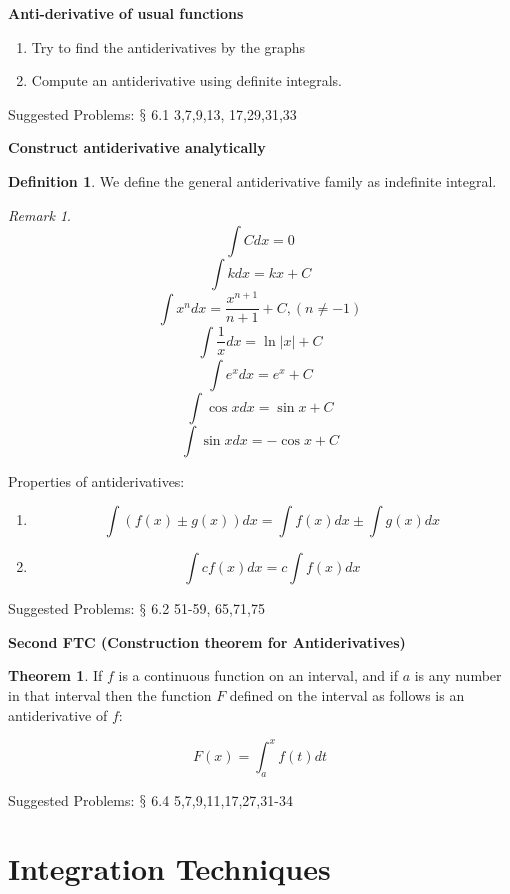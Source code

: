 \documentclass[12pt]{article}
\theoremstyle{definition}
\newtheorem{thm}{Theorem}[section]
\theoremstyle{definition}
\newtheorem{definition}{Definition}[section]
\theoremstyle{remark}
\newtheorem*{remark}{Remark}
\theoremstyle{definition}
\theoremstyle{definition}
\theoremstyle{definition}
\begin{document}
\textbf{Anti-derivative of usual functions}

\begin{enumerate}
	\item Try to find the antiderivatives by the graphs
	\item Compute an antiderivative using definite integrals.
\end{enumerate}

Suggested Problems: $\mathsection$ 6.1 3,7,9,13, 17,29,31,33

\hrulefill

\textbf{Construct antiderivative analytically}

\begin{definition}
	We define the general antiderivative family as indefinite integral.
\end{definition}

\begin{remark}
	\[\int C dx = 0\]
	\[\int kdx=kx+C\]
	\[\int x^ndx=\frac{x^{n+1}}{n+1}+C, (n \neq -1)\]
	\[\int \frac{1}{x}dx = \ln|x|+C\]
	\[\int e^xdx=e^x+C \]
	\[\int \cos xdx=\sin x + C \]
	\[\int \sin xdx=-\cos x + C \]	
	
\end{remark}


\hrulefill


Properties of antiderivatives:

\begin{enumerate}
\item \[\int (f(x) \pm g(x))dx=\int f(x) dx \pm \int g(x) dx\]
\item \[\int cf(x) dx = c \int f(x) dx\]
\end{enumerate}


Suggested Problems: $\mathsection$  6.2 51-59, 65,71,75


\hrulefill

\textbf{Second FTC (Construction theorem for Antiderivatives)}

\begin{thm}
If $f$ is a continuous function on an interval, and if $a$ is any number in that interval then the function $F$ defined on the interval as follows is an antiderivative of $f$:

\[F(x)=\int^x_a f(t) dt\]
\end{thm}

Suggested Problems: $\mathsection$ 6.4  5,7,9,11,17,27,31-34



\section{Integration Techniques}
\end{document}
